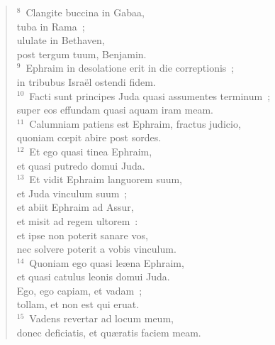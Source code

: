 \begin{flushleft}
\begin{verse}
${}^{8}$~Clangite buccina in Gabaa,\\ tuba in Rama~;\\ ululate in Bethaven,\\ post tergum tuum, Benjamin.\\
${}^{9}$~Ephraim in desolatione erit in die correptionis~;\\ in tribubus Isra\"el ostendi fidem.\\
${}^{10}$~Facti sunt principes Juda quasi assumentes terminum~;\\ super eos effundam quasi aquam iram meam.\\
${}^{11}$~Calumniam patiens est Ephraim, fractus judicio,\\ quoniam cœpit abire post sordes.\\
${}^{12}$~Et ego quasi tinea Ephraim,\\ et quasi putredo domui Juda.\\
${}^{13}$~Et vidit Ephraim languorem suum,\\ et Juda vinculum suum~;\\ et abiit Ephraim ad Assur,\\ et misit ad regem ultorem~:\\ et ipse non poterit sanare vos,\\ nec solvere poterit a vobis vinculum.\\
${}^{14}$~Quoniam ego quasi le\ae na Ephraim,\\ et quasi catulus leonis domui Juda.\\ Ego, ego capiam, et vadam~;\\ tollam, et non est qui eruat.\\
${}^{15}$~Vadens revertar ad locum meum,\\ donec deficiatis, et qu\ae ratis faciem meam.\end{verse}\end{flushleft}


